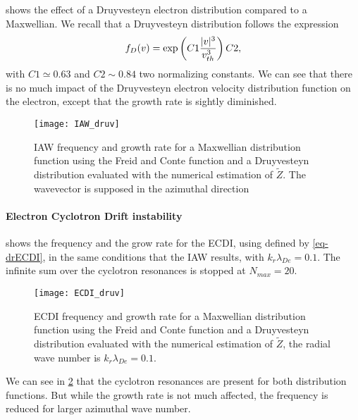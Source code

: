      shows the effect of a Druyvesteyn electron distribution compared to a Maxwellian.
    We recall that a Druyvesteyn distribution follows the expression
    \begin{equation} \label{eq-druyv}
      f_{D}(v) = \exp \left( C1 \frac{\lvert v\rvert^3}{v_{th}^3}  \right) C2,
    \end{equation}
    with $C1 \simeq 0.63$ and $C2 \sim 0.84$ two normalizing constants.
    We can see that there is no much impact of the Druyvesteyn electron velocity distribution function on the electron, except that the growth rate is sightly diminished.
    
    \begin{figure}[hbtp]
      \centering
      \texttt{[image: IAW\_druv]}
      \caption{\ac{IAW} frequency and growth rate for a Maxwellian distribution function using the Freid and Conte function and a Druyvesteyn distribution evaluated with the numerical estimation of $\tilde{Z}$. The wavevector is supposed in the azimuthal direction }
      \label{fig-IAW_druv}
    \end{figure}
    
    \paragraph{Electron Cyclotron Drift instability\\}
    
       shows the frequency and the grow rate for the \ac{ECDI}, using defined by \cref{eq-drECDI}, in the same conditions that the \ac{IAW} results, with $k_r \lambda_{De} = 0.1 $.
      The infinite sum over the cyclotron resonances is stopped at $N_{max} = 20$.
      
      
      \begin{figure}[hbtp]
      \centering
      \texttt{[image: ECDI\_druv]}
      \caption{\ac{ECDI} frequency and growth rate for a Maxwellian distribution function using the Freid and Conte function and a Druyvesteyn distribution evaluated with the numerical estimation of $\tilde{Z}$, the radial wave number is $k_r \lambda_{De} = 0.1 $.}
      \label{fig-ECDI_druv}
    \end{figure}
    
    We can see in \cref{fig-ECDI_druv} that the cyclotron resonances are present for both distribution functions.
    But while the growth rate is not much affected, the frequency is reduced for larger azimuthal wave number.
    
